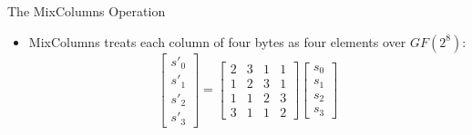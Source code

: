 \documentclass{cubeamer}
\begin{document}
\begin{frame}{The MixColumns Operation}
    \begin{itemize}
        \item MixColumns treats each column of four bytes as four elements over $GF(2^8)$:
        \vspace{0.5em}
        \[
        \begin{bmatrix}
        s'_0 \\
        s'_1 \\
        s'_2 \\
        s'_3
        \end{bmatrix}
        =
        \begin{bmatrix}
        2 & 3 & 1 & 1 \\
        1 & 2 & 3 & 1 \\
        1 & 1 & 2 & 3 \\
        3 & 1 & 1 & 2
        \end{bmatrix}
        \begin{bmatrix}
        s_0 \\
        s_1 \\
        s_2 \\
        s_3
        \end{bmatrix}
        \]
        \vspace{0.5em}

    \end{itemize}
\end{frame}
\end{document}
